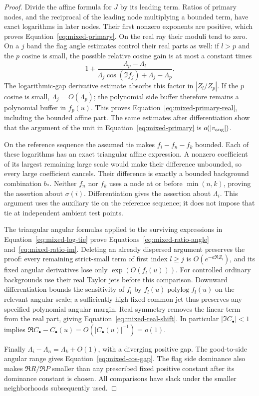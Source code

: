 \begin{proof}
Divide the affine formula for $J$ by its leading term. Ratios of
primary nodes, and the reciprocal of the leading node multiplying a
bounded term, have exact logarithms in later nodes. Their first
nonzero exponents are positive, which proves
Equation~\eqref{eq:mixed-primary}. On the real ray their moduli tend
to zero. On a $j$ band the flag angle estimates control their real
parts as well: if $l>p$ and the $p$ cosine is small, the possible
relative cosine gain is at most a constant times
\[
 1+\frac{\Lambda_p-\Lambda_l}
 {\Lambda_j\cos(\Im f_j)+\Lambda_j-\Lambda_p}.
\]
The logarithmic-gap derivative estimate absorbs this factor in
$|Z_l/Z_p|$. If the $p$ cosine is small, $\Lambda_j=O(\Lambda_p)$;
the polynomial side buffer therefore remains a polynomial buffer in
$f_p(u)$. This proves Equation~\eqref{eq:mixed-primary-real}, including
the bounded affine part. The same estimates after differentiation
show that the argument of the unit in
Equation~\eqref{eq:mixed-primary} is $o(|v_{\rm ang}|)$.

On the reference sequence the assumed tie makes
$f_i-f_n-f_k$ bounded. Each of these logarithms has an exact
triangular affine expression. A nonzero coefficient of its largest
remaining large scale would make their difference unbounded, so
every large coefficient cancels. Their difference is exactly a
bounded background combination $b_*$. Neither $f_n$ nor $f_k$ uses
a node at or before $\min(n,k)$, proving the assertion about
$\sigma(i)$. Differentiation gives the assertion about $\Lambda_i$.
This argument uses the auxiliary tie on the reference sequence; it
does not impose that tie at independent ambient test points.

The triangular angular formulas applied to the surviving expressions
in Equation~\eqref{eq:mixed-log-tie} prove
Equations~\eqref{eq:mixed-ratio-angle} and~\eqref{eq:mixed-ratio-im}.
Deleting an already dispersed argument preserves the proof: every
remaining strict-small term of first index $l\geq j$ is
$O(e^{-a\Re Z_l})$, and its fixed angular derivatives lose only
$\exp(O(f_l(u)))$. For controlled ordinary backgrounds use their
real Taylor jets before this comparison. Downward differentiation
bounds the sensitivity of $f_l$ by
$f_l(u)\operatorname{polylog}f_l(u)$ on the relevant angular scale;
a sufficiently high fixed common jet thus preserves any specified
polynomial angular margin. Real symmetry removes the linear term
from the real part, giving Equation~\eqref{eq:mixed-real-shift}.
In particular $|\Im C_\bullet|<1$ implies
$\Re C_\bullet-C_\bullet(u)=O(|C_\bullet(u)|^{-1})=o(1)$.

Finally $\Lambda_i-\Lambda_n=\Lambda_k+O(1)$, with a diverging
positive gap. The good-to-side angular range gives
Equation~\eqref{eq:mixed-cos-gap}. The flag side dominance also makes
$\Re R/\Re P$ smaller than any prescribed fixed positive constant
after its dominance constant is chosen. All comparisons have slack
under the smaller neighborhoods subsequently used.
\end{proof}

